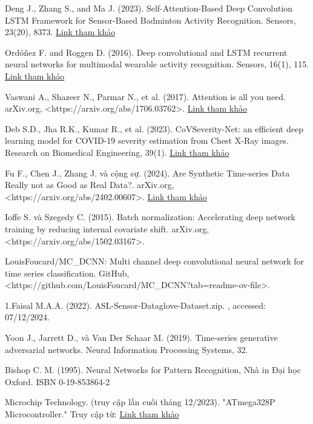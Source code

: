 \newpage
{}
\renewcommand\refname{Tài liệu tham khảo}
\begin{thebibliography}{3}
    \item Deng J., Zhang S., and Ma J. (2023). Self-Attention-Based Deep Convolution LSTM Framework for Sensor-Based Badminton Activity Recognition. Sensors, 23(20), 8373. \href{https://doi.org/10.3390/s23208373}{Link tham khảo}
    \item Ordóñez F. and Roggen D. (2016). Deep convolutional and LSTM recurrent neural networks for multimodal wearable activity recognition. Sensors, 16(1), 115. \href{https://doi.org/10.3390/s16010115}{Link tham khảo}
    \item Vaswani A., Shazeer N., Parmar N., et al. (2017). Attention is all you need. arXiv.org, <https://arxiv.org/abs/1706.03762>. \href{https://arxiv.org/abs/1706.03762}{Link tham khảo}
    \item Deb S.D., Jha R.K., Kumar R., et al. (2023). CoVSeverity-Net: an efficient deep learning model for COVID-19 severity estimation from Chest X-Ray images. Research on Biomedical Engineering, 39(1). \href{https://doi.org/10.1007/s42662-022-00377-1}{Link tham khảo}
    \item Fu F., Chen J., Zhang J. và cộng sự. (2024). Are Synthetic Time-series Data Really not as Good as Real Data?. arXiv.org, <https://arxiv.org/abs/2402.00607>. \href{https://arxiv.org/abs/2402.00607}{Link tham khảo}
    \item Ioffe S. và Szegedy C. (2015). Batch normalization: Accelerating deep network training by reducing internal covariate shift. arXiv.org, <https://arxiv.org/abs/1502.03167>.
    \item LouisFoucard/MC_DCNN: Multi channel deep convolutional neural network for time series classification. GitHub, <https://github.com/LouisFoucard/MC_DCNN?tab=readme-ov-file>.
    \item 1.Faisal M.A.A. (2022). ASL-Sensor-Dataglove-Dataset.zip. , accessed: 07/12/2024.
    \item Yoon J., Jarrett D., và Van Der Schaar M. (2019). Time-series generative adversarial networks. Neural Information Processing Systems, 32.
    \item Bishop C. M. (1995). Neural Networks for Pattern Recognition, Nhà in Đại học Oxford. ISBN 0-19-853864-2
    \item Microchip Technology. (truy cập lần cuối tháng 12/2023). "ATmega328P Microcontroller." Truy cập từ: \href{https://www.microchip.com/en-us/product/ATmega328P}{Link tham khảo} 

\end{thebibliography}
